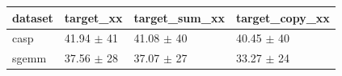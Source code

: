\begin{tabular}{llll}
\toprule
dataset & target\_xx & target\_sum\_xx & target\_copy\_xx \\
\midrule
casp & 41.94 $\pm$ 41 & 41.08 $\pm$ 40 & 40.45 $\pm$ 40 \\
sgemm & 37.56 $\pm$ 28 & 37.07 $\pm$ 27 & 33.27 $\pm$ 24 \\
\bottomrule
\end{tabular}
